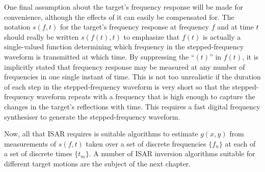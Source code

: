 One final assumption about the target's frequency response will be made for
convenience, although the effects of it can easily be compensated for.  The
notation $s(f,t)$ for the target's frequency response at frequency $f$ and
at time $t$ should really be written $s(f(t),t)$ to emphasize that $f(t)$ is
actually a single-valued function determining which frequency in the
stepped-frequency waveform is transmitted at which time.  By suppressing the
``$(t)$'' in $f(t)$, it is implicitly stated that frequency response may be
measured at any number of frequencies in one single instant of time.  This is
not too unrealistic if the duration of each step in the stepped-frequency
waveform is very short so that the stepped-frequency waveform repeats with a
frequency that is high enough to capture the changes in the target's
reflections with time.  This requires a fast digital frequency synthesiser 
to generate the stepped-frequency waveform.

Now, all that ISAR requires is suitable algorithms to estimate $g(x,y)$ from
measurements of $s(f,t)$ taken over a set of discrete frequencies $\{f_n\}$ 
at each of a set of discrete times $\{t_m\}$.  A number of ISAR inversion 
algorithms suitable for different target motions are the subject of the next 
chapter.  

